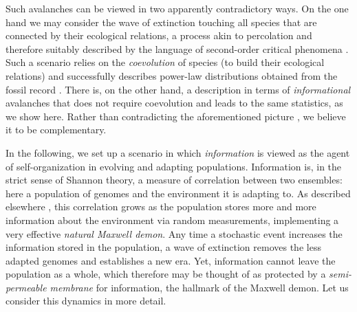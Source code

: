 \documentclass[letterpaper]{article}
\begin{document}
Such avalanches can be viewed in two apparently contradictory ways. On
the one hand we may consider the wave of extinction touching all
species that are connected by their ecological relations, a process
akin to percolation and therefore suitably described by the language
of second-order critical phenomena \citep{BS}. Such a scenario relies
on the {\em coevolution} of species (to build their ecological
relations) and successfully describes power-law distributions obtained
from the fossil record \citep{SB96,BP96}. There is, on the other hand,
a description in terms of {\em informational} avalanches that does not
require coevolution and leads to the same statistics, as we show
here. Rather than contradicting the aforementioned picture
\citep{NFST}, we believe it to be complementary.

In the following, we set up a scenario in which {\em information} is
viewed as the agent of self-organization in evolving and adapting
populations. Information is, in the strict sense of Shannon theory, a
measure of correlation between two ensembles: here a population of
genomes and the environment it is adapting to. As described elsewhere
\citep{IAL}, this correlation grows as the population stores more and
more information about the environment via random measurements,
implementing a very effective {\em natural Maxwell demon}. Any time a
stochastic event increases the information stored in the population, a
wave of extinction removes the less adapted genomes and establishes a
new era. Yet, information cannot leave the population as a whole,
which therefore may be thought of as protected by a {\em
semi-permeable membrane} for information, the hallmark of the Maxwell
demon. Let us consider this dynamics in more detail.
\end{document}

